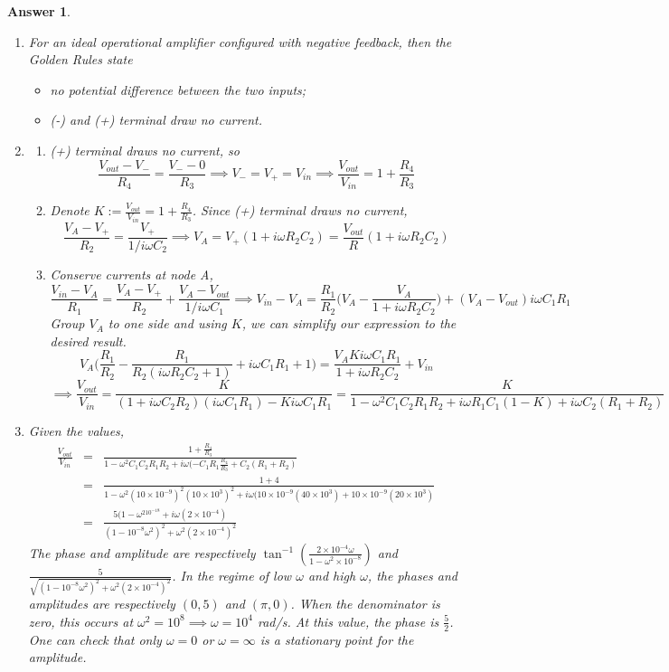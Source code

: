 \documentclass[a4paper]{article}
\newtheorem{ans}{Answer}[subsection]
\theoremstyle{new}
\begin{document}
\newpage
\begin{ans}\leavevmode
\begin{enumerate}[label=(\roman*)]
\item For an ideal operational amplifier configured with negative feedback, then the Golden Rules state
\begin{itemize}
    \item no potential difference between the two inputs;
    \item (-) and (+) terminal draw no current.
\end{itemize}
\item
\begin{enumerate}[label=(\alph*)]
\item (+) terminal draws no current, so
$$\frac{V_{out}-V_-}{R_4}=\frac{V_--0}{R_3}\implies V_-=V_+=V_{in}\implies\frac{V_{out}}{V_{in}}=1+\frac{R_4}{R_3}$$
\item Denote $K:=\frac{V_{out}}{V_{in}}=1+\frac{R_4}{R_3}$. Since (+) terminal draws no current,
$$\frac{V_A-V_+}{R_2}=\frac{V_+}{1/i\omega C_2}\implies V_A=V_+(1+i\omega R_2C_2)=\frac{V_{out}}{R}(1+i\omega R_2C_2)$$
\item Conserve currents at node A,
$$\frac{V_{in}-V_A}{R_1}=\frac{V_A-V_+}{R_2}+\frac{V_A-V_{out}}{1/i\omega C_1}\implies V_{in}-V_A=\frac{R_1}{R_2}\bigg(V_A-\frac{V_A}{1+i\omega R_2C_2}\bigg)+(V_A-V_{out})i\omega C_1R_1$$
Group $V_A$ to one side and using $K$, we can simplify our expression to the desired result.
$$V_A\bigg(\frac{R_1}{R_2}-\frac{R_1}{R_2(i\omega R_2C_2+1)}+i\omega C_1R_1+1\bigg)=\frac{V_AKi\omega C_1R_1}{1+i\omega R_2C_2}+V_{in}$$
$$\implies\frac{V_{out}}{V_{in}}=\frac{K}{(1+i\omega C_2R_2)(i\omega C_1R_1)-Ki\omega C_1R_1}=\frac{K}{1-\omega^2C_1C_2R_1R_2+i\omega R_1C_1(1-K)+i\omega C_2(R_1+R_2)}$$
\end{enumerate}
\item Given the values,
\begin{eqnarray}
\frac{V_{out}}{V_{in}}&=&\frac{1+\frac{R_4}{R_3}}{1-\omega^2C_1C_2R_1R_2+i\omega(-C_1R_1\frac{R_4}{R_3}+C_2(R_1+R_2)}\nonumber\\&=&\frac{1+4}{1-\omega^2(10\times10^{-9})^2(10\times10^3)^2+i\omega(10\times10^{-9}(40\times10^3)+10\times10^{-9}(20\times10^3)}\nonumber\\&=&\frac{5(1-\omega^210^{-18}+i\omega(2\times10^{-4})}{(1-10^{-8}\omega^2)^2+\omega^2(2\times10^{-4})^2}\nonumber
\end{eqnarray}
The phase and amplitude are respectively $\tan^{-1}(\frac{2\times10^{-4}\omega}{1-\omega^2\times10^{-8}})$ and $\frac{5}{\sqrt{(1-10^{-8}\omega^2)^2+\omega^2(2\times10^{-4})^2}}$. In the regime of low $\omega$ and high $\omega$, the phases and amplitudes are respectively $(0,5)$ and $(\pi,0)$. When the denominator is zero, this occurs at $\omega^2=10^8\implies\omega=10^4$ rad/s. At this value, the phase is $\frac{5}{2}$. One can check that only $\omega=0$ or $\omega=\infty$ is a stationary point for the amplitude.\\[5pt]

\end{enumerate}
\end{ans}
\end{document}
